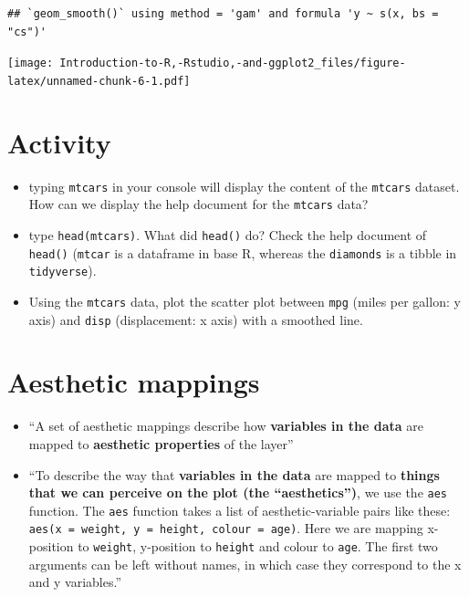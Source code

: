 \documentclass[]{book}
\begin{document}
\begin{verbatim}
## `geom_smooth()` using method = 'gam' and formula 'y ~ s(x, bs = "cs")'
\end{verbatim}

\texttt{[image: Introduction-to-R,-Rstudio,-and-ggplot2\_files/figure-latex/unnamed-chunk-6-1.pdf]}

\section{Activity}\label{activity}

\begin{itemize}
\item
  typing \texttt{mtcars} in your console will display the content of the
  \texttt{mtcars} dataset. How can we display the help document for the
  \texttt{mtcars} data?
\item
  type \texttt{head(mtcars)}. What did \texttt{head()} do? Check the
  help document of \texttt{head()} (\texttt{mtcar} is a dataframe in
  base R, whereas the \texttt{diamonds} is a tibble in
  \texttt{tidyverse}).
\item
  Using the \texttt{mtcars} data, plot the scatter plot between
  \texttt{mpg} (miles per gallon: y axis) and \texttt{disp}
  (displacement: x axis) with a smoothed line.
\end{itemize}

\section{Aesthetic mappings}\label{aesthetic-mappings}

\begin{itemize}
\item
  ``A set of aesthetic mappings describe how \textbf{variables in the
  data} are mapped to \textbf{aesthetic properties} of the layer''
  \citep{ggplot2}
\item
  ``To describe the way that \textbf{variables in the data} are mapped
  to \textbf{things that we can perceive on the plot (the
  ``aesthetics'')}, we use the \texttt{aes} function. The \texttt{aes}
  function takes a list of aesthetic-variable pairs like these:
  \texttt{aes(x\ =\ weight,\ y\ =\ height,\ colour\ =\ age)}. Here we
  are mapping x-position to \texttt{weight}, y-position to
  \texttt{height} and colour to \texttt{age}. The first two arguments
  can be left without names, in which case they correspond to the x and
  y variables.'' \citep{ggplot2}
\end{itemize}
\end{document}
